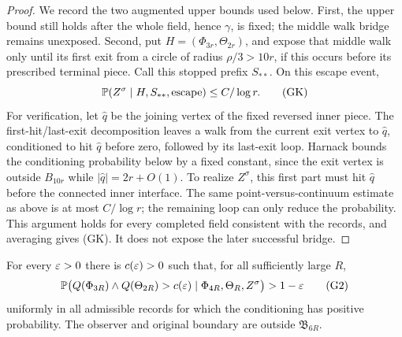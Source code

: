 \begin{proof}
We record the two augmented upper bounds used below. First, the upper
bound still holds after the whole field, hence \(\gamma\), is fixed;
the middle walk bridge remains unexposed. Second, put
\(H=(\Phi_{3r},\Theta_{2r})\), and expose that middle walk only until
its first exit from a circle of radius \(\rho/3>10r\), if this occurs
before its prescribed terminal piece. Call this stopped prefix
\(S_{**}\). On this escape event,
\[
 \mathbb P(Z^\sigma\mid H,S_{**},\hbox{escape})
       \leq C/\log r.                              \tag{GK}
\]
For verification, let \(\hat q\) be the joining vertex of the fixed
reversed inner piece. The first-hit/last-exit decomposition leaves a
walk from the current exit vertex to \(\hat q\), conditioned to hit
\(\hat q\) before zero, followed by its last-exit loop. Harnack bounds
the conditioning probability below by a fixed constant, since the
exit vertex is outside \(B_{10r}\) while
\(|\hat q|=2r+O(1)\). To realize \(Z^\sigma\), this first part
must hit \(\hat q\) before the connected inner interface. The same
point-versus-continuum estimate as above is at most \(C/\log r\);
the remaining loop can only reduce the probability. This argument
holds for every completed field consistent with the records, and
averaging gives (GK). It does not expose the later successful bridge.
\end{proof}

\begin{lemma}\label{g:separation}
For every \(\varepsilon>0\) there is \(c(\varepsilon)>0\) such that, for all
sufficiently large \(R\),
\[
 \mathbb P\bigl(
 Q(\Phi_{3R})\wedge Q(\Theta_{2R})>c(\varepsilon)
 \mid \Phi_{4R},\Theta_R,Z^\sigma\bigr)>1-\varepsilon
 \tag{G2}
\]
uniformly in all admissible records for which the conditioning has
positive probability. The observer and original boundary are outside
\(\mathfrak B_{6R}\).
\end{lemma}

